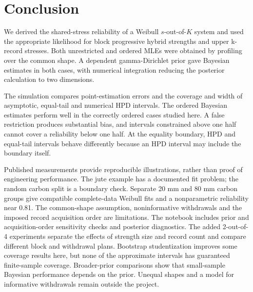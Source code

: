 \documentclass[a4paper,11pt]{article}
\begin{document}






\clearpage
\section{Conclusion}\label{sec:conclusion}
We derived the shared-stress reliability of a Weibull $s$-out-of-$K$ system and used the appropriate likelihood for block progressive hybrid strengths and upper k-record stresses. Both unrestricted and ordered MLEs were obtained by profiling over the common shape. A dependent gamma-Dirichlet prior gave Bayesian estimates in both cases, with numerical integration reducing the posterior calculation to two dimensions.

The simulation compares point-estimation errors and the coverage and width of asymptotic, equal-tail and numerical HPD intervals. The ordered Bayesian estimates perform well in the correctly ordered cases studied here. A false restriction produces substantial bias, and intervals constrained above one half cannot cover a reliability below one half. At the equality boundary, HPD and equal-tail intervals behave differently because an HPD interval may include the boundary itself.

Published measurements provide reproducible illustrations, rather than proof of engineering performance. The jute example has a documented fit problem; the random carbon split is a boundary check. Separate 20 mm and 80 mm carbon groups give compatible complete-data Weibull fits and a nonparametric reliability near 0.81. The common-shape assumption, noninformative withdrawals and the imposed record acquisition order are limitations. The notebook includes prior and acquisition-order sensitivity checks and posterior diagnostics. The added 2-out-of-4 experiments separate the effects of strength size and record count and compare different block and withdrawal plans. Bootstrap studentization improves some coverage results here, but none of the approximate intervals has guaranteed finite-sample coverage. Broader-prior comparisons show that small-sample Bayesian performance depends on the prior. Unequal shapes and a model for informative withdrawals remain outside the project.

\clearpage


\clearpage
\begingroup
\small

\endgroup
\end{document}
